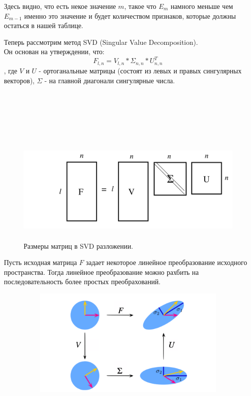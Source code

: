 \documentclass[12pt,a4paper]{article}
\begin{document}
Здесь видно, что есть некое значение $m$, такое что $E_m$ намного меньше чем $E_{m-1}$ именно это значение и будет количеством признаков, которые должны остаться в нашей таблице.

Теперь рассмотрим метод SVD (Singular Value Decomposition).\\
Он основан на утверждении, что:
$$
    F_{l, n} = V_{l, n} * \Sigma_{n, n} * U^T_{n, n}
$$
, где $V$ и $U$ - ортоганальные матрицы (состоят из левых и правых сингулярных векторов), $\Sigma$ - на главной диагонали сингулярные числа.\\
\\
\\
\\
\\
\\


\begin{figure}[h]
\includegraphics[scale=0.75, width = 480, height = 200]{singular_value_decomp.png}
\caption{Размеры матриц в SVD разложении.}
\label{ris:image}
\end{figure}

Пусть исходная матрица $F$ задает некоторое линейное преобразование исходного пространства. 
Тогда линейное преобразование можно рахбить на последовательность более простых преобрахований.

\begin{figure}[h]
\includegraphics[scale=0.75, width = 480, height = 200]{Screenshot from 2022-10-22 22-07-19.png}
\label{ris:image}
\end{figure}
\end{document}
